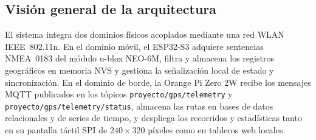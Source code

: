 \documentclass[12pt, letterpaper]{article}
\begin{document}
\subsection*{Visión general de la arquitectura}

El sistema integra dos dominios físicos acoplados mediante una red WLAN IEEE~802.11n. En el dominio móvil, el ESP32-S3 adquiere sentencias NMEA~0183 del módulo u-blox NEO-6M, filtra y almacena los registros geográficos en memoria NVS y gestiona la señalización local de estado y sincronización. En el dominio de borde, la Orange Pi Zero 2W recibe los mensajes MQTT publicados en los tópicos \texttt{proyecto/gps/telemetry} y \texttt{proyecto/gps/telemetry/status}, almacena las rutas en bases de datos relacionales y de series de tiempo, y despliega los recorridos y estadísticas tanto en su pantalla táctil SPI de $240 \times 320$ píxeles como en tableros web locales.

\end{document}
